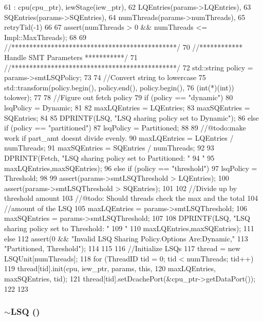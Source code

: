 \begin{DoxyCode}
61     : cpu(cpu_ptr), iewStage(iew_ptr),
62       LQEntries(params->LQEntries),
63       SQEntries(params->SQEntries),
64       numThreads(params->numThreads),
65       retryTid(-1)
66 {
67     assert(numThreads > 0 && numThreads <= Impl::MaxThreads);
68 
69     //**********************************************/
70     //************ Handle SMT Parameters ***********/
71     //**********************************************/
72     std::string policy = params->smtLSQPolicy;
73 
74     //Convert string to lowercase
75     std::transform(policy.begin(), policy.end(), policy.begin(),
76                    (int(*)(int)) tolower);
77 
78     //Figure out fetch policy
79     if (policy == "dynamic") {
80         lsqPolicy = Dynamic;
81 
82         maxLQEntries = LQEntries;
83         maxSQEntries = SQEntries;
84 
85         DPRINTF(LSQ, "LSQ sharing policy set to Dynamic\n");
86     } else if (policy == "partitioned") {
87         lsqPolicy = Partitioned;
88 
89         //@todo:make work if part_amt doesnt divide evenly.
90         maxLQEntries = LQEntries / numThreads;
91         maxSQEntries = SQEntries / numThreads;
92 
93         DPRINTF(Fetch, "LSQ sharing policy set to Partitioned: "
94                 "%
95                 maxLQEntries,maxSQEntries);
96     } else if (policy == "threshold") {
97         lsqPolicy = Threshold;
98 
99         assert(params->smtLSQThreshold > LQEntries);
100         assert(params->smtLSQThreshold > SQEntries);
101 
102         //Divide up by threshold amount
103         //@todo: Should threads check the max and the total
104         //amount of the LSQ
105         maxLQEntries  = params->smtLSQThreshold;
106         maxSQEntries  = params->smtLSQThreshold;
107 
108         DPRINTF(LSQ, "LSQ sharing policy set to Threshold: "
109                 "%
110                 maxLQEntries,maxSQEntries);
111     } else {
112         assert(0 && "Invalid LSQ Sharing Policy.Options Are:{Dynamic,"
113                     "Partitioned, Threshold}");
114     }
115 
116     //Initialize LSQs
117     thread = new LSQUnit[numThreads];
118     for (ThreadID tid = 0; tid < numThreads; tid++) {
119         thread[tid].init(cpu, iew_ptr, params, this,
120                          maxLQEntries, maxSQEntries, tid);
121         thread[tid].setDcachePort(&cpu_ptr->getDataPort());
122     }
123 }
\end{DoxyCode}
\hypertarget{classLSQ_aacb0af998a42267ae15bb83ec2b0753a}{
\subsubsection[{$\sim$LSQ}]{\setlength{\rightskip}{0pt plus 5cm}$\sim${\bf LSQ} ()}}
\label{classLSQ_aacb0af998a42267ae15bb83ec2b0753a}



